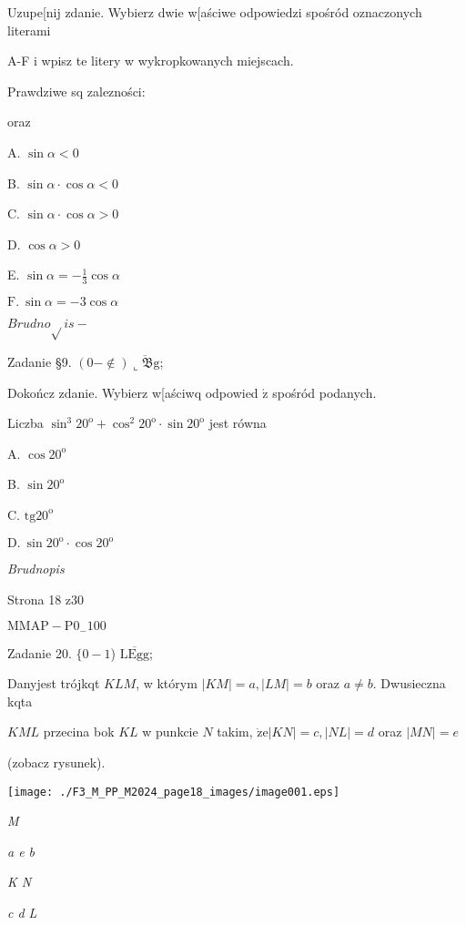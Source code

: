 \documentclass[a4paper,12pt]{article}
\begin{document}
Uzupe[nij zdanie. Wybierz dwie w[aściwe odpowiedzi spośród oznaczonych literami

A-F i wpisz te litery w wykropkowanych miejscach.

Prawdziwe sq zalezności:

oraz

A. $\sin\alpha<0$

B. $\sin\alpha\cdot\cos\alpha<0$

C. $\sin\alpha\cdot\cos\alpha>0$

D. $\cos\alpha>0$

E. $\displaystyle \sin\alpha=-\frac{1}{3}\cos\alpha$

$\mathrm{F}.\ \sin\alpha=-3\cos\alpha$

$Brudno\sqrt{}is -$

Zadanie \S 9. $(0-\not\in) \overline{\llcorner \mathfrak{B}\mathrm{g}}$;

Dokończ zdanie. Wybierz w[aściwq odpowied $\acute{\mathrm{z}}$ spośród podanych.

Liczba $\sin^{3}20^{\mathrm{o}}+\cos^{2}20^{\mathrm{o}}\cdot\sin 20^{\mathrm{o}}$ jest równa

A. $\cos 20^{\mathrm{o}}$

B. $\sin 20^{\mathrm{o}}$

C. $\mathrm{t}\mathrm{g}20^{\mathrm{o}}$

$\mathrm{D}.\ \sin 20^{\mathrm{o}}\cdot\cos 20^{\mathrm{o}}$

{\it Brudnopis}

Strona 18 z30

$\mathrm{M}\mathrm{M}\mathrm{A}\mathrm{P}-\mathrm{P}0_{-}100$





Zadanie 20. $\{0-1$) $\overline{\mathrm{L}\mathrm{E}\mathrm{g}\mathrm{g}}$;

Danyjest trójkqt $KLM$, w którym $|KM|=a, |LM|=b$ oraz $a\neq b$. Dwusieczna kqta

$KML$ przecina bok $KL$ w punkcie $N$ takim, $\dot{\mathrm{z}}\mathrm{e} |KN|=c, |NL|=d$ oraz $|MN|=e$

(zobacz rysunek).
\begin{center}
\texttt{[image: ./F3\_M\_PP\_M2024\_page18\_images/image001.eps]}
\end{center}
{\it M}

{\it a e  b}

{\it K N}

{\it c  d L}
\end{document}
